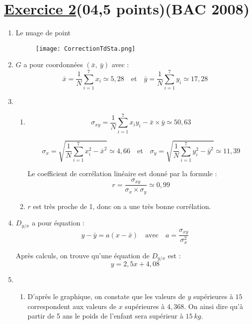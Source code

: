 \documentclass[12pt,a4paper]{article}
\begin{document}
\section*{\underline{Exercice 2}(04,5 points)(BAC 2008)} 
\begin{enumerate}
\item Le nuage de point
          \begin{center}
              \begin{figure}[H]%
                  \centering
                  \texttt{[image: CorrectionTdSta.png]}
                  \label{fig:monimage}
              \end{figure}
          \end{center}
\item \( G \) a pour coordonnées \( (\bar{x},\ \bar{y}) \) avec :
\[
\bar{x} = \frac{1}{N} \sum_{i=1}^{7} x_i \simeq 5{,}28 \quad \text{et} \quad \bar{y} = \frac{1}{N} \sum_{i=1}^{7} y_i \simeq 17{,}28
\]
\item 
\begin{enumerate}
\item 
\[
\sigma_{xy} = \frac{1}{N} \sum_{i=1}^{7} x_i y_i - \bar{x} \times \bar{y} \simeq 50{,}63
\]

\[
\sigma_x = \sqrt{ \frac{1}{N} \sum_{i=1}^{7} x_i^2 - \bar{x}^2 } \simeq 4{,}66
\quad \text{et} \quad
\sigma_y = \sqrt{ \frac{1}{N} \sum_{i=1}^{7} y_i^2 - \bar{y}^2 } \simeq 11{,}39
\]

Le coefficient de corrélation linéaire est donné par la formule :
\[
r = \frac{\sigma_{xy}}{\sigma_x \times \sigma_y} \simeq 0{,}99
\]

\item \( r \) est très proche de 1, donc on a une très bonne corrélation.
\end{enumerate}
\vspace{0.5cm}

\item \( D_{y/x} \) a pour équation :
\[
y - \bar{y} = a(x - \bar{x})
\quad \text{avec} \quad a = \frac{\sigma_{xy}}{\sigma_x^2}
\]

\vspace{0.2cm}

Après calculs, on trouve qu’une équation de \( D_{y/x} \) est :
\[
y = 2{,}5x + 4{,}08
\]
\item
\begin{enumerate}
\item D’après le graphique, on constate que les valeurs de \( y \) supérieures à \( 15 \) correspondent aux valeurs de \( x \) supérieures à \( 4{,}368 \).
On ainsi dire qu’à partir de 5 ans le poids de l’enfant sera supérieur à \( 15~kg \).


\end{enumerate}
\end{enumerate}
\end{document}
